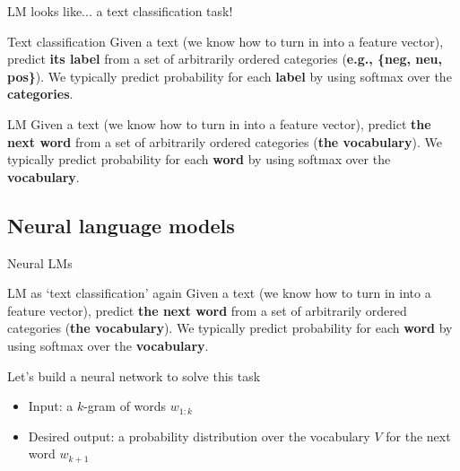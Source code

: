 \documentclass[12pt,aspectratio=169,handout]{beamer}
\begin{document}
\begin{frame}{LM looks like... a text classification task!}

\begin{block}{Text classification}
Given a text (we know how to turn in into a feature vector), predict \textbf{its label} from a set of arbitrarily ordered categories (\textbf{e.g., \{neg, neu, pos\}}). We typically predict probability for each \textbf{label} by using softmax over the \textbf{categories}.
\end{block}
\pause

\begin{block}{LM}
Given a text (we know how to turn in into a feature vector), predict \textbf{the next word} from a set of arbitrarily ordered categories (\textbf{the vocabulary}). We typically predict probability for each \textbf{word} by using softmax over the \textbf{vocabulary}.
\end{block}

\end{frame}



\subsection{Neural language models}

\begin{frame}{Neural LMs}

\begin{block}{LM as `text classification' again}
Given a text (we know how to turn in into a feature vector), predict \textbf{the next word} from a set of arbitrarily ordered categories (\textbf{the vocabulary}). We typically predict probability for each \textbf{word} by using softmax over the \textbf{vocabulary}.
\end{block}
	
Let's build a neural network to solve this task
\pause
	\begin{itemize}
		\item Input: a $k$-gram of words $w_{1:k}$
		\item Desired output: a probability distribution over the vocabulary $V$ for the next word $w_{k+1}$
	\end{itemize}
	
\end{frame}
\end{document}
